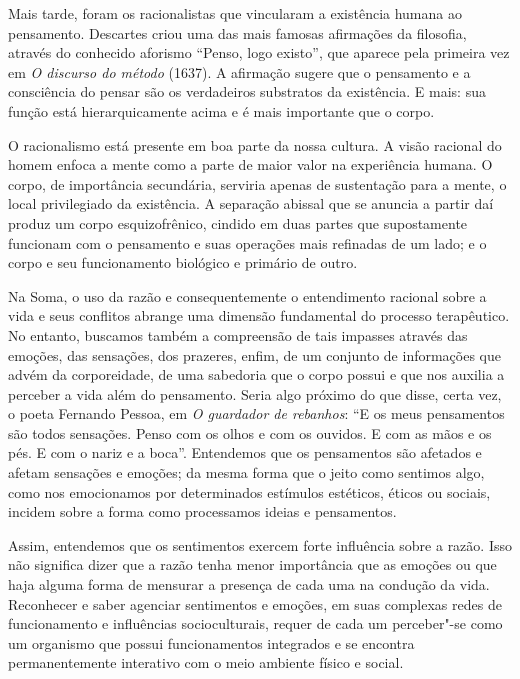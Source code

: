 Mais tarde, foram os racionalistas que vincularam a existência humana ao
pensamento. Descartes criou uma das mais famosas afirmações da
filosofia, através do conhecido aforismo ``Penso, logo existo'', que
aparece pela primeira vez em \emph{O discurso do método} (1637). A
afirmação sugere que o pensamento e a consciência do pensar são os
verdadeiros substratos da existência. E mais: sua função está
hierarquicamente acima e é mais importante que o corpo.

O racionalismo está presente em boa parte da nossa cultura. A visão
racional do homem enfoca a mente como a parte de maior valor na
experiência humana. O corpo, de importância secundária, serviria apenas
de sustentação para a mente, o local privilegiado da existência. A
separação abissal que se anuncia a partir daí produz um corpo
esquizofrênico, cindido em duas partes que supostamente funcionam com o
pensamento e suas operações mais refinadas de um lado; e o corpo e seu
funcionamento biológico e primário de outro.

Na Soma, o uso da razão e consequentemente o entendimento racional sobre
a vida e seus conflitos abrange uma dimensão fundamental do processo
terapêutico. No entanto, buscamos também a compreensão de tais impasses
através das emoções, das sensações, dos prazeres, enfim, de um conjunto
de informações que advém da corporeidade, de uma sabedoria que o corpo
possui e que nos auxilia a perceber a vida além do pensamento. Seria
algo próximo do que disse, certa vez, o poeta Fernando Pessoa, em %
\emph{O guardador de rebanhos}: ``E os meus pensamentos são todos
sensações. Penso com os olhos e com os ouvidos. E com as mãos e os pés.
E com o nariz e a boca''. Entendemos que os pensamentos são afetados e
afetam sensações e emoções; da mesma forma que o jeito como sentimos
algo, como nos emocionamos por determinados estímulos estéticos, éticos
ou sociais, incidem sobre a forma como processamos ideias e pensamentos.

Assim, entendemos que os sentimentos exercem forte influência sobre a
razão. Isso não significa dizer que a razão tenha menor importância que
as emoções ou que haja alguma forma de mensurar a presença de cada uma
na condução da vida. Reconhecer e saber agenciar sentimentos e emoções,
em suas complexas redes de funcionamento e influências socioculturais,
requer de cada um perceber"-se como um organismo que possui
funcionamentos integrados e se encontra permanentemente interativo com o
meio ambiente físico e social.

